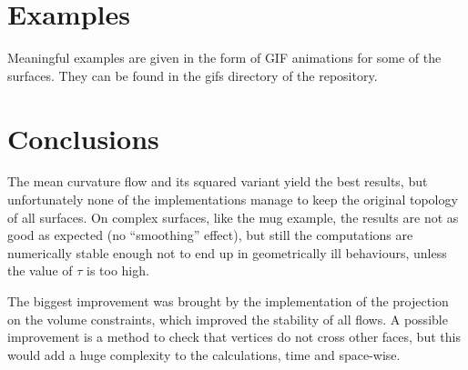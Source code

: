 \documentclass{article}
\begin{document}
\section*{Examples}
Meaningful examples are given in the form of GIF animations for some of the surfaces.
They can be found in the gifs directory of the repository.

\section*{Conclusions}
The mean curvature flow and its squared variant yield the best results, but
unfortunately none of the implementations manage to keep the original topology of
all surfaces. On complex surfaces, like the mug example, the results are
not as good as expected (no ``smoothing'' effect), but still the computations
are numerically stable enough not to end up in geometrically ill behaviours,
unless the value of $\tau$ is too high.

The biggest improvement was brought by the implementation of the projection
on the volume constraints, which improved the stability of all flows.
A possible improvement is a method to check that vertices do not cross other
faces, but this would add a huge complexity to the calculations, time and space-wise.
\end{document}

